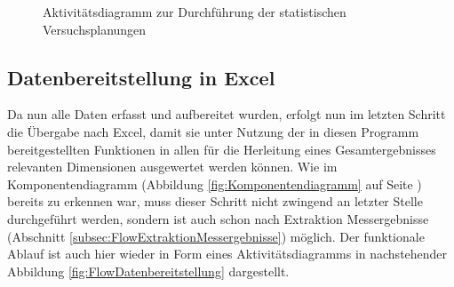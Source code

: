 \documentclass[
fontsize=10pt, 
listof = totoc,
parskip = half	
]{report}
\begin{document}
\begin{figure}[H]
	\centering
	\caption{Aktivitätsdiagramm zur Durchführung der statistischen Versuchsplanungen}
	\label{fig:FlowVersuchsplanung}
\end{figure}

\subsection{Datenbereitstellung in Excel}
\label{subsec:FlowDataToExcel}

Da nun alle Daten erfasst und aufbereitet wurden, erfolgt nun im letzten Schritt die Übergabe nach Excel, damit sie unter Nutzung der in diesen Programm bereitgestellten Funktionen in allen für die Herleitung eines Gesamtergebnisses relevanten Dimensionen ausgewertet werden können. Wie im Komponentendiagramm (Abbildung \ref{fig:Komponentendiagramm} auf Seite \pageref{fig:Komponentendiagramm}) bereits zu erkennen war, muss dieser Schritt nicht zwingend an letzter Stelle durchgeführt werden, sondern ist auch schon nach Extraktion Messergebnisse (Abschnitt \ref{subsec:FlowExtraktionMessergebnisse}) möglich. Der funktionale Ablauf ist auch hier wieder in Form eines Aktivitätsdiagramms in nachstehender Abbildung \ref{fig:FlowDatenbereitstellung} dargestellt.
\end{document}
